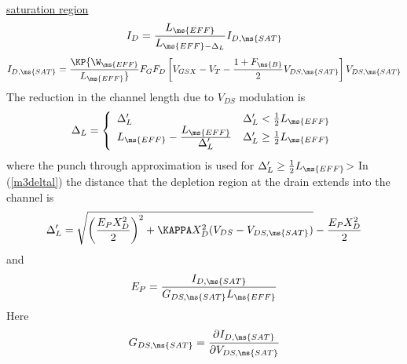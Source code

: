 \\[0.2in]
%
%
\underline{saturation region}
\begin{equation}
I_{D} = {{L_{\ms{EFF}}}\over{\textstyle L_{\ms{EFF}-\Delta_L}}}
I_{D,\ms{SAT}}
      \label{mos3satids}
\end{equation}
\begin{equation}
I_{D,\ms{SAT}}  =   \KP {{\W_{\ms{EFF}}}\over{ L_{\ms{EFF}}}} F_G
F_D
           \left[ V_{GSX} - V_T - {{1 + F_{\ms{B}}}\over 2} V_{DS,\ms{SAT}}
       \right] V_{DS,\ms{SAT}}
\end{equation}
The reduction in the channel length due to $V_{DS}$ modulation is
\begin{equation}
\Delta_L = \left\{ \begin{array}{ll}
            \Delta'_L    & \Delta'_L < \frac{1}{2} L_{\ms{EFF}}\\
            L_{\ms{EFF}} - {{\textstyle L_{\ms{EFF}}} \over
            {\textstyle \Delta'_L}}
             & \Delta'_L \ge \frac{1}{2} L_{\ms{EFF}}
        \end{array} \right. %
            \label{m3deltal}
\end{equation}
where the punch through approximation is used for $\Delta'_L \ge
\frac{1}{2} L_{\ms{EFF}}$> In (\ref{m3deltal}) the distance that
the depletion region at the drain extends into the channel is
\begin{equation}
\Delta'_L = \sqrt{ \left( {{E_PX_D^2} \over 2}\right)^2
                           + \KAPPA X_D^2(V_{DS} - V_{DS,\ms{SAT}})}
            - {{E_PX_D^2}\over2}
\end{equation}
and
\begin{equation}
E_P = {{I_{D,\ms{SAT}}}\over{G_{DS,\ms{SAT}}L_{\ms{EFF}}}}
\end{equation}
Here
\begin{equation}
G_{DS,\ms{SAT}} = {{\partial I_{D,\ms{SAT}}}\over{\partial
V_{DS,\ms{SAT}}}}
\end{equation}
